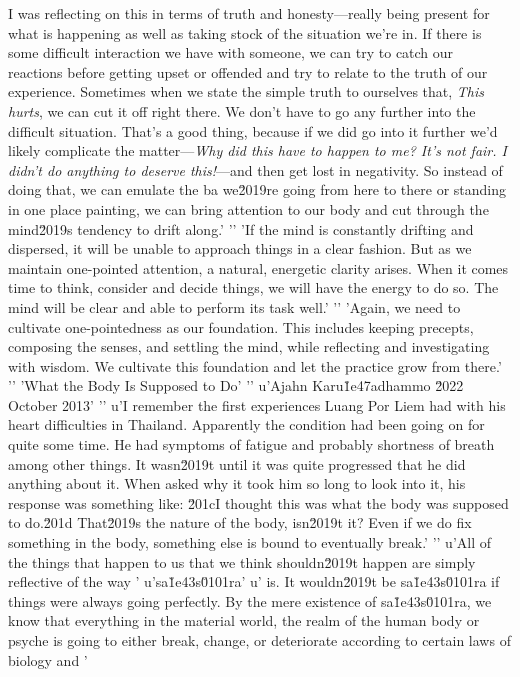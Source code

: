 I was reflecting on this in terms of truth and honesty---really being 
present for what is happening as well as taking stock of the situation 
we're in. If there is some difficult interaction we have with someone, 
we can try to catch our reactions before getting upset or offended and 
try to relate to the truth of our experience. Sometimes when we state 
the simple truth to ourselves that, \emph{This hurts}, we can cut it 
off right there. We don't have to go any further into the difficult 
situation. That's a good thing, because if we did go into it further 
we'd likely complicate the matter---\emph{Why did this have to happen 
to me? It's not fair. I didn't do anything to deserve this!}---and then 
get lost in negativity. So instead of doing that, we can emulate the 
ba we\u2019re going from here to there or standing in one place painting, we can bring attention to our body and cut through the mind\u2019s tendency to drift along.'
'\n'
'If the mind is constantly drifting and dispersed, it will be unable to approach things in a clear fashion. But as we maintain one-pointed attention, a natural, energetic clarity arises. When it comes time to think, consider and decide things, we will have the energy to do so. The mind will be clear and able to perform its task well.'
'\n'
'Again, we need to cultivate one-pointedness as our foundation. This includes keeping precepts, composing the senses, and settling the mind, while reflecting and investigating with wisdom. We cultivate this foundation and let the practice grow from there.'
'\n'
'What the Body Is Supposed to Do'
'\n'
u'Ajahn Karu\u1e47adhammo \u2022 October 2013'
'\n'
u'I remember the first experiences Luang Por Liem had with his heart difficulties in Thailand. Apparently the condition had been going on for quite some time. He had symptoms of fatigue and probably shortness of breath among other things. It wasn\u2019t until it was quite progressed that he did anything about it. When asked why it took him so long to look into it, his response was something like: \u201cI thought this was what the body was supposed to do.\u201d That\u2019s the nature of the body, isn\u2019t it? Even if we do fix something in the body, something else is bound to eventually break.'
'\n'
u'All of the things that happen to us that we think shouldn\u2019t happen are simply reflective of the way '
u'sa\u1e43s\u0101ra'
u' is. It wouldn\u2019t be sa\u1e43s\u0101ra if things were always going perfectly. By the mere existence of sa\u1e43s\u0101ra, we know that everything in the material world, the realm of the human body or psyche is going to either break, change, or deteriorate according to certain laws of biology and '
